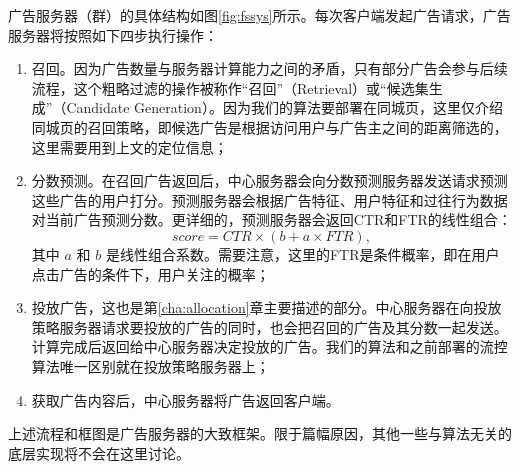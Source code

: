 广告服务器（群）的具体结构如图\ref{fig:fssys}所示。每次客户端发起广告请求，广告服务器将按照如下四步执行操作：
\begin{enumerate}
	\item 召回。因为广告数量与服务器计算能力之间的矛盾，只有部分广告会参与后续流程，这个粗略过滤的操作被称作“召回”（Retrieval）或“候选集生成”（Candidate Generation）。因为我们的算法要部署在同城页，这里仅介绍同城页的召回策略，即候选广告是根据访问用户与广告主之间的距离筛选的，这里需要用到上文的定位信息；
	\item 分数预测。在召回广告返回后，中心服务器会向分数预测服务器发送请求预测这些广告的用户打分。预测服务器会根据广告特征、用户特征和过往行为数据对当前广告预测分数。更详细的，预测服务器会返回CTR和FTR的线性组合：
	\begin{equation}
		score = CTR \times  (b + a \times FTR), \label{eq:score}
	\end{equation}
	其中 $a$ 和 $b$ 是线性组合系数。需要注意，这里的FTR是条件概率，即在用户点击广告的条件下，用户关注的概率；
	\item 投放广告，这也是第\ref{cha:allocation}章主要描述的部分。中心服务器在向投放策略服务器请求要投放的广告的同时，也会把召回的广告及其分数一起发送。计算完成后返回给中心服务器决定投放的广告。我们的算法和之前部署的流控算法唯一区别就在投放策略服务器上；
	\item 获取广告内容后，中心服务器将广告返回客户端。
\end{enumerate}

上述流程和框图是广告服务器的大致框架。限于篇幅原因，其他一些与算法无关的底层实现将不会在这里讨论。





